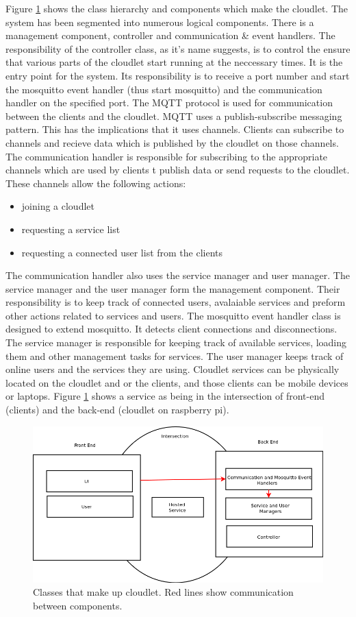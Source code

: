 Figure \ref{fig:objstruc} shows the class hierarchy and components which make the cloudlet. The system has been segmented into numerous logical components. There is a management component, controller and communication \& event handlers. The responsibility of the controller class, as it's name suggests, is to control the ensure that various parts of the cloudlet start running at the neccessary times. It is the entry point for the system. Its responsibility is to receive a port number and start the mosquitto event handler (thus start mosquitto) and the communication handler on the specified port. The MQTT protocol is used for communication between the clients and the cloudlet. MQTT uses a publish-subscribe messaging pattern. This has the implications that it uses channels. Clients can subscribe to channels and recieve data which is published by the cloudlet on those channels. The communication handler is responsible for subscribing to the appropriate channels which are used by clients t publish data or send requests to the cloudlet. These channels allow the following actions:
\begin{itemize}
\item joining a cloudlet
\item requesting a service list
\item requesting a connected user list from the clients
\end{itemize}
The communication handler also uses the service manager and
user manager. The service manager and the user manager form the management component. Their responsibility is to keep track of connected users, avalaiable services and preform other actions related to services and users. The mosquitto event handler class is designed to extend mosquitto. It detects client connections and disconnections. The service manager is responsible for keeping track of available services, loading them and other management tasks for services. The user manager keeps track of online users and the services they are using. Cloudlet services can be physically located on the cloudlet and or the clients, and those clients can be mobile devices or laptops. Figure \ref{fig:objstruc} shows a service as being in the intersection of front-end (clients) and the back-end (cloudlet on raspberry pi).

\begin{figure}
\centering
\includegraphics[scale=0.4]{figures/newcomponentstructure}
\caption{Classes that make up cloudlet. Red lines show communication between components.}
\label{fig:objstruc}
\end{figure}


